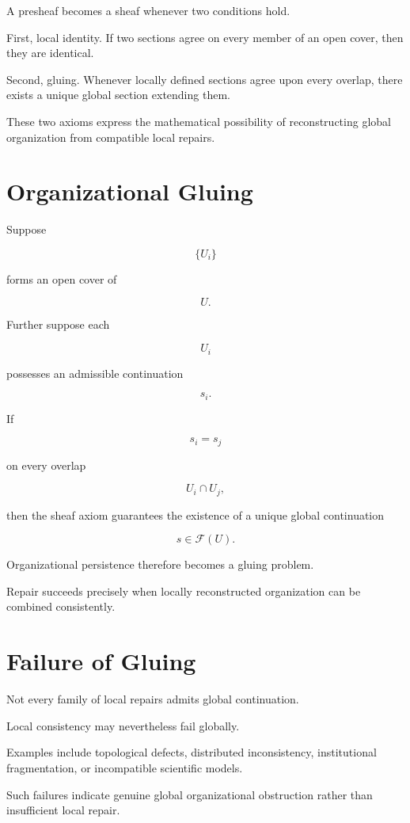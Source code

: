 \documentclass[11pt,oneside]{book}
\numberwithin{equation}{chapter}
\theoremstyle{definition}
\theoremstyle{plain}
\begin{document}
A presheaf becomes a sheaf whenever two conditions hold.

First, local identity. If two sections agree on every member of an open
cover, then they are identical.

Second, gluing. Whenever locally defined sections agree upon every
overlap, there exists a unique global section extending them.

These two axioms express the mathematical possibility of reconstructing
global organization from compatible local repairs.

\section{Organizational Gluing}

Suppose

\[
\{U_i\}
\]

forms an open cover of

\[
U.
\]

Further suppose each

\[
U_i
\]

possesses an admissible continuation

\[
s_i.
\]

If

\[
s_i
=
s_j
\]

on every overlap

\[
U_i
\cap
U_j,
\]

then the sheaf axiom guarantees the existence of a unique global
continuation

\[
s
\in
\mathcal F(U).
\]

Organizational persistence therefore becomes a gluing problem.

Repair succeeds precisely when locally reconstructed organization can be
combined consistently.

\section{Failure of Gluing}

Not every family of local repairs admits global continuation.

Local consistency may nevertheless fail globally.

Examples include topological defects, distributed inconsistency,
institutional fragmentation, or incompatible scientific models.

Such failures indicate genuine global organizational obstruction rather
than insufficient local repair.
\end{document}
